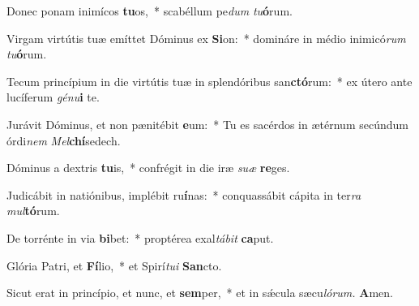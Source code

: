 \item Donec ponam inimícos \textbf{tu}os,~* scabéllum pe\hspace{0.03em}\textit{dum} \textit{tu}\textbf{ó}rum.
\item Virgam virtútis tuæ emíttet Dóminus ex \textbf{Si}on:~* domináre in médio inimicó\textit{rum} \textit{tu}\textbf{ó}rum.
\item Tecum princípium in die virtútis tuæ in splendóribus san\textbf{ctó}rum:~* ex útero ante lucíferum \textit{génu}\textbf{i} te.
\item Jurávit Dóminus, et non pænitébit \textbf{e}um:~* Tu es sacérdos in ætérnum secúndum órdi\textit{nem} \textit{Mel}\textbf{chí}sedech.
\item Dóminus a dextris \textbf{tu}is,~* confrégit in die iræ \textit{suæ} \textbf{re}ges.
\item Judicábit in natiónibus, implébit ru\textbf{í}nas:~* conquassábit cápita in ter\textit{ra} \textit{mul}\textbf{tó}rum.
\item De torrénte in via \textbf{bi}bet:~* proptérea exal\textit{tábit} \textbf{ca}put.
\item Glória Patri, et \textbf{Fí}lio,~* et Spirí\hspace{0.03em}\textit{tui} \textbf{San}cto.
\item Sicut erat in princípio, et nunc, et \textbf{sem}per,~* et in sǽcula sæcu\hspace{0.03em}\textit{lórum.} \textbf{A}men.
